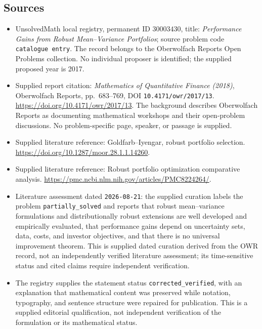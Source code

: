 \documentclass[11pt]{article}
\begin{document}
\subsection{Sources}
\begin{itemize}
\item UnsolvedMath local registry, permanent ID \(30003430\), title: \emph{Performance Gains from Robust Mean--Variance Portfolios}; source problem code \texttt{catalogue entry}. The record belongs to the Oberwolfach Reports Open Problems collection. No individual proposer is identified; the supplied proposed year is 2017.
\item Supplied report citation: \emph{Mathematics of Quantitative Finance (2018)}, Oberwolfach Reports, pp.~683--769, DOI \texttt{10.4171/owr/2017/13}. \url{https://doi.org/10.4171/owr/2017/13}. The background describes Oberwolfach Reports as documenting mathematical workshops and their open-problem discussions. No problem-specific page, speaker, or passage is supplied.
\item Supplied literature reference: Goldfarb--Iyengar, robust portfolio selection. \url{https://doi.org/10.1287/moor.28.1.1.14260}.
\item Supplied literature reference: Robust portfolio optimization comparative analysis. \url{https://pmc.ncbi.nlm.nih.gov/articles/PMC8224264/}.
\item Literature assessment dated \texttt{2026-08-21}: the supplied curation labels the problem \texttt{partially\_solved} and reports that robust mean--variance formulations and distributionally robust extensions are well developed and empirically evaluated, that performance gains depend on uncertainty sets, data, costs, and investor objectives, and that there is no universal improvement theorem. This is supplied dated curation derived from the OWR record, not an independently verified literature assessment; its time-sensitive status and cited claims require independent verification.
\item The registry supplies the statement status \texttt{corrected\_verified}, with an explanation that mathematical content was preserved while notation, typography, and sentence structure were repaired for publication. This is a supplied editorial qualification, not independent verification of the formulation or its mathematical status.
\end{itemize}
\end{document}
